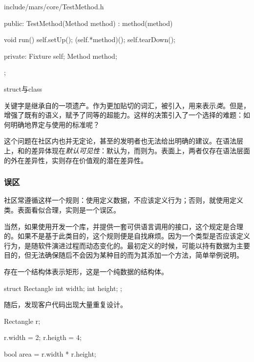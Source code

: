 \begin{content}
\begin{diff}{include/mars/core/TestMethod.h}
\begin{minicpp}
{public:
  TestMethod(Method method)
    : method(method) {}

  void run() {
    self.setUp();
    (self.*method)();
    self.tearDown();
  }

private:
  Fixture self;
  Method method;
};
  \end{minicpp}
\end{diff}

\begin{episode}{struct与class}
\begin{content}

关键字是\cpp{}继承自\clang{}的一项遗产。作为更加贴切的词汇，被引入\cpp{}，用来表示\emph{类}。但是，\cpp{}增强了既有的语义，赋予了同等的超能力。这样的决策引入了一个选择的难题：如何明确地界定与使用的标准呢？

这个问题在社区内也并无定论，甚至\cpp{}的发明者也无法给出明确的建议。在语法层上，和的差异体现在\emph{默认可见性}：默认为，而则为。表面上，两者仅存在语法层面的外在差异性，实则存在价值观的潜在差异性。

\subsubsection{误区}

社区常遵循这样一个规则：使用定义数据，不应该定义行为；否则，就使用定义类。表面看似合理，实则是一个误区。

当然，如果使用\cpp{}开发一个库，并提供一套可供\clang{}语言调用的接口，这个规定是合理的。如果不是基于此类目的，这个规则便是自找麻烦。因为一个类型是否应该定义行为，是随软件演进过程而动态变化的。最初定义的时候，可能以持有数据为主要目的，但无法确保随后不会因为某种目的而为其添加一个方法，简单举例说明。

存在一个结构体表示矩形，这是一个纯数据的结构体。

\begin{c++}
struct Rectangle {
  int width;
  int height;
};
\end{c++}

随后，发现客户代码出现大量重复设计。

\begin{c++}
Rectangle r;

r.width = 2;
r.heigth = 4;

bool area = r.width * r.height;
\end{c++}


\end{content}
\end{episode}
\end{content}
